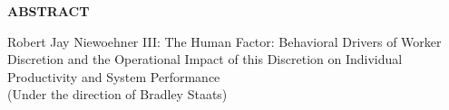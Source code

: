 
\begin{center}
\vspace*{52pt}
{\normalfont\textbf{ABSTRACT}}
\vspace{11pt}

\begin{singlespace}
Robert Jay Niewoehner III: The Human Factor: Behavioral Drivers of Worker Discretion and the Operational Impact of this Discretion on Individual Productivity and System Performance \\
(Under the direction of Bradley Staats)
\end{singlespace}
\end{center}

